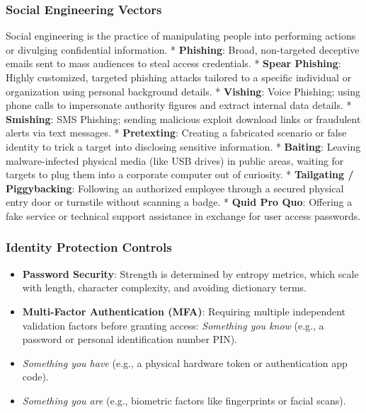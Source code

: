 \documentclass[12pt,openany]{book}
\begin{document}
\subsubsection*{Social Engineering Vectors}


Social engineering is the practice of manipulating people into performing actions or divulging confidential information.
* \textbf{Phishing}: Broad, non-targeted deceptive emails sent to mass audiences to steal access credentials.
* \textbf{Spear Phishing}: Highly customized, targeted phishing attacks tailored to a specific individual or organization using personal background details.
* \textbf{Vishing}: Voice Phishing; using phone calls to impersonate authority figures and extract internal data details.
* \textbf{Smishing}: SMS Phishing; sending malicious exploit download links or fraudulent alerts via text messages.
* \textbf{Pretexting}: Creating a fabricated scenario or false identity to trick a target into disclosing sensitive information.
* \textbf{Baiting}: Leaving malware-infected physical media (like USB drives) in public areas, waiting for targets to plug them into a corporate computer out of curiosity.
* \textbf{Tailgating / Piggybacking}: Following an authorized employee through a secured physical entry door or turnstile without scanning a badge.
* \textbf{Quid Pro Quo}: Offering a fake service or technical support assistance in exchange for user access passwords.


\subsubsection*{Identity Protection Controls}


\begin{itemize}

  \item \textbf{Password Security}: Strength is determined by entropy metrics, which scale with length, character complexity, and avoiding dictionary terms.

  \item \textbf{Multi-Factor Authentication (MFA)}: Requiring multiple independent validation factors before granting access:
\textit{Something you know} (e.g., a password or personal identification number PIN).

  \item \textit{Something you have} (e.g., a physical hardware token or authentication app code).

  \item \textit{Something you are} (e.g., biometric factors like fingerprints or facial scans).

\end{itemize}
\end{document}
